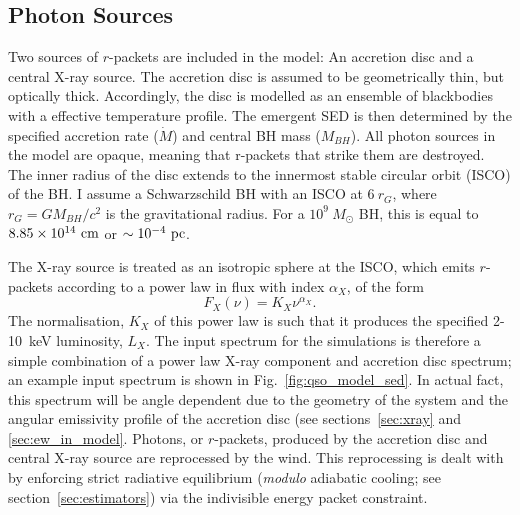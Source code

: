\subsection{Photon Sources}
\label{sec:photon_sources}

Two sources of $r$-packets are included in the model:
An accretion disc and a central X-ray source.
The accretion disc is assumed to be geometrically thin, 
but optically thick.
Accordingly, the disc is modelled as an ensemble of blackbodies with a 
\cite{shakurasunyaev1973} effective temperature profile. 
The emergent SED is then determined by the specified accretion rate ($\dot{M}$)
and central BH mass ($M_{BH}$).
All photon sources in the model are opaque, meaning
that r-packets that strike them are destroyed.
The inner radius of the disc extends to the innermost 
stable circular orbit (ISCO) of the BH. 
I assume a Schwarzschild BH with an ISCO at $6~r_G$, where 
$r_G = GM_{BH}/c^2$ is the gravitational radius.
For a $10^9~M_\odot$ BH, this is equal to $8.85\times10^{14}~{\rm cm}$ 
or $\sim10^{-4}~{\rm pc}$. 


The X-ray source is treated as an isotropic sphere at the ISCO,
which emits $r$-packets according to a power law in flux with index $\alpha_X$, of the form
\begin{equation}
F_X (\nu) = K_X \nu^{\alpha_X}.
\end{equation}
The normalisation, $K_X$ of this power law is such that it 
produces the specified 2-10~keV luminosity, $L_X$.
The input spectrum for the simulations is therefore a simple combination
of a power law X-ray component and accretion disc spectrum; an example input
spectrum is shown in Fig.~\ref{fig:qso_model_sed}. In actual fact, this
spectrum will be angle dependent due to the geometry of the system and 
the angular emissivity profile of the accretion disc (see sections~\ref{sec:xray}
and \ref{sec:ew_in_model}.
Photons, or $r$-packets, produced by the accretion disc and central X-ray source
are reprocessed by the wind. This reprocessing is dealt with by enforcing strict
radiative equilibrium ({\em modulo} adiabatic cooling; see section~\ref{sec:estimators})
via the indivisible energy packet constraint.  

